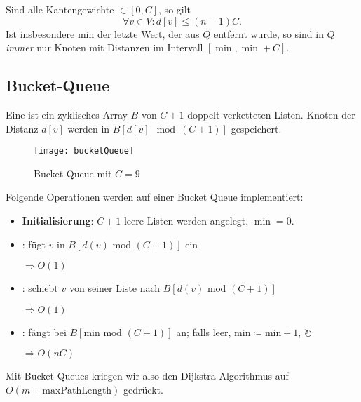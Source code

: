 Sind alle Kantengewichte \( \in [0,C] \), so gilt
\begin{equation*}
  \forall v \in V: d[v] \leq (n-1)C\text{.}
\end{equation*}
Ist insbesondere min der letzte Wert, der aus \( Q \) entfernt wurde, so sind in \( Q \) \emph{immer} nur Knoten mit Distanzen im Intervall \( [\min, \min+C] \).

\subsection{Bucket-Queue}

\begin{minipage}{.55\textwidth}
  Eine  ist ein zyklisches Array \( B \) von \( C+1 \) doppelt verketteten Listen. Knoten der Distanz \( d[v] \) werden in \( B[d[v] \mod (C+1)] \) gespeichert.  
\end{minipage}
\hfill
\begin{minipage}{.5\textwidth}
  \begin{figure}[H]
    \texttt{[image: bucketQueue]}
    \caption{Bucket-Queue mit \( C = 9 \)}
  \end{figure}
\end{minipage}

Folgende Operationen werden auf einer Bucket Queue implementiert:
\begin{itemize}
  \item \textbf{Initialisierung}: \( C+1 \) leere Listen werden angelegt, \( \min = 0 \).
  \item \textbf{}: fügt \( v \) in \( B[d(v) \text{ mod } (C+1)] \) ein 
  
  \( \Rightarrow O(1) \)

  \item \textbf{}: schiebt \( v \) von seiner Liste nach \( B[d(v) \text{ mod } (C+1)] \)

  \( \Rightarrow O(1) \)

  \item \textbf{}: fängt bei \( B[\text{min mod } (C+1)] \) an; falls leer, \( \text{min} \coloneqq \text{min}+1 \), \( \circlearrowright \)
  
  \( \Rightarrow O(nC) \)
\end{itemize}

Mit Bucket-Queues kriegen wir also den Dijkstra-Algorithmus auf \( O(m+\text{maxPathLength}) \) gedrückt.

